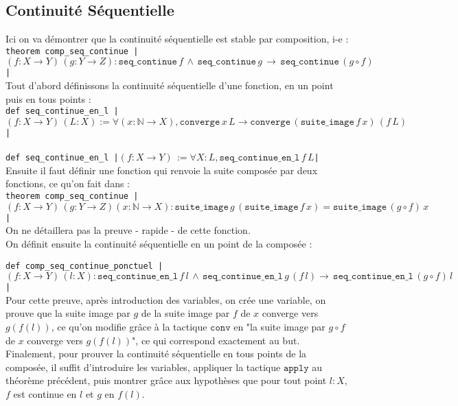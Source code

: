 \subsection{Continuité Séquentielle}
Ici on va démontrer que la continuité séquentielle est stable par composition, i-e : \\
\texttt{theorem comp_seq_continue |$(f : X \to Y) \,(g : Y \to Z) : \texttt{seq\_continue}\, f \, \land \,  \texttt{seq\_continue} \, g \, \to \, \texttt{seq\_continue} \, (g \circ f)$|} \\
Tout d'abord définissons la continuité séquentielle d'une fonction, en un point puis en tous points : \\
\texttt{def seq_continue_en_l |$(f : X \to Y) \,(L : X) := \forall (x:\mathbb{N}\to X), \texttt{converge} \, x \, L \to \texttt{converge} \, ( \texttt{suite\_image} \, f \, x)\, (f \, L)$|} \\ 
\\
\texttt{def seq_continue_en_l |$(f : X \to Y) \, := \forall X : L, \texttt{seq\_continue\_en\_l} \, f \, L$|}\\

Ensuite il faut définir une fonction qui renvoie la suite composée par deux fonctions, ce qu'on fait dans : \\
\texttt{theorem comp_seq_continue |$(f : X \to Y) \,(g : Y \to Z)(x : \mathbb{N} \to X) : \texttt{suite\_image}\, g \, (\texttt{suite\_image} \, f \,x) =  \texttt{suite\_image} \, (g \circ f) \, x$|} \\
On ne détaillera pas la preuve - rapide - de cette fonction.\\
On définit ensuite la continuité séquentielle en un point de la composée : 

\texttt{def comp_seq_continue_ponctuel |$(f : X \to Y) \,(l : X) : \texttt{seq\_continue\_en\_l}\, f \, l \, \land \,  \texttt{seq\_continue\_en\_l} \, g \, (f \, l) \to \, \texttt{seq\_continue\_en\_l} \, (g \circ f) \, l$|} \\

Pour cette preuve, après introduction des variables, on crée une variable, on prouve que la suite image par $g$ de la suite image par $f$ de $x$ converge vers $g(f(l))$, ce qu'on modifie grâce à la tactique $\texttt{conv}$ en "la suite image par $g \circ f$ de $x$ converge vers $g(f(l))$", ce qui correspond exactement au but.\\

Finalement, pour prouver la continuité séquentielle en tous points de la composée, il suffit d'introduire les variables, appliquer la tactique $\texttt{apply}$ au théorème précédent, puis montrer grâce aux hypothèses que pour tout point $l:X$, $f$ est continue en $l$ et $g$ en $f(l)$.\\

